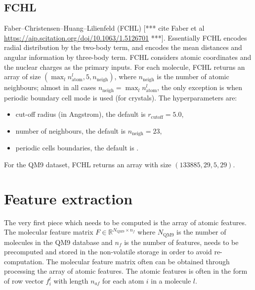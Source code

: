 \documentclass[12pt]{article}
\def\att{                    %
        \marginpar[ \hspace*{\fill} \raisebox{-0.2em}{\rule{2mm}{1.2em}} ]
        {\raisebox{-0.2em}{\rule{2mm}{1.2em}} }
        }
\def\at#1{[*** \att #1 ***]}  %
\begin{document}
\subsection{FCHL}
Faber--Christensen--Huang--Lilienfeld (FCHL) \at{cite Faber et al \url{https://aip.scitation.org/doi/10.1063/1.5126701}}. Essentially FCHL encodes radial distribution by the two-body term, and encodes the mean distances and angular information by three-body term. FCHL considers atomic coordinates and the nuclear charges as the primary inputs. For each molecule, FCHL returns an array of size $(\max_l n^l_\text{atom}, 5, n_\text{neigh})$, where $n_\text{neigh}$ is the number of atomic neighbours; almost in all cases $n_\text{neigh} = \max_l n^l_\text{atom}$, the only exception is when periodic boundary cell mode is used (for crystals). The hyperparameters are: 
\begin{itemize}
	\item cut-off radius (in Angstrom), the default is $r_\text{cutoff} = 5.0$,
	\item number of neighbours, the default is $n_\text{neigh} = 23$,
	\item periodic cells boundaries, the default is .
\end{itemize}
For the QM9 dataset, FCHL returns an array with size $(133885, 29, 5, 29)$.

\section{Feature extraction}
\label{sec:feature}
The very first piece which needs to be computed is the array of atomic features. 
The molecular feature matrix $F \in \mathbb{R}^{N_\text{QM9} \times n_f}$ where $N_\text{QM9}$ is the number of molecules in the QM9 database and $n_f$ is the number of features, needs to be precomputed and stored in the non-volatile storage in order to avoid re-computation.
The molecular feature matrix often can be obtained through processing the array of atomic features.
The atomic features is often in the form of row vector $f^l_{i}$ with length $n_{af}$ for each atom $i$ in a molecule $l$.
\end{document}

